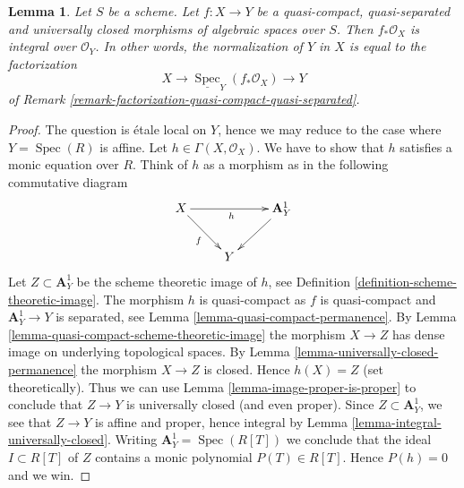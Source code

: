 \documentclass[10pt,a4paper]{amsart}
\theoremstyle{plain}
\newtheorem{lemma}[subsection]{Lemma}
\theoremstyle{definition}
\theoremstyle{remark}
\numberwithin{equation}{subsection}
\def\Spec{\mathop{\mathrm{Spec}}}
\begin{document}
\begin{lemma}
\label{lemma-normalization-in-universally-closed}
Let $S$ be a scheme.
Let $f : X \to Y$ be a quasi-compact, quasi-separated and
universally closed morphisms of algebraic spaces over $S$.
Then $f_*\mathcal{O}_X$ is integral over $\mathcal{O}_Y$. In other
words, the normalization of $Y$ in $X$ is equal to the factorization
$$
X \longrightarrow \underline{\Spec}_Y(f_*\mathcal{O}_X)
\longrightarrow Y
$$
of Remark \ref{remark-factorization-quasi-compact-quasi-separated}.
\end{lemma}

\begin{proof}
The question is \'etale local on $Y$, hence we may reduce to the
case where $Y = \Spec(R)$ is affine. Let $h \in \Gamma(X, \mathcal{O}_X)$.
We have to show that $h$ satisfies a monic equation over $R$. Think of $h$
as a morphism as in the following commutative diagram
$$
\xymatrix{
X \ar[rr]_h \ar[rd]_f & & \mathbf{A}^1_Y \ar[ld] \\
& Y &
}
$$
Let $Z \subset \mathbf{A}^1_Y$ be the scheme theoretic image of $h$,
see Definition \ref{definition-scheme-theoretic-image}.
The morphism $h$ is quasi-compact as $f$ is quasi-compact and
$\mathbf{A}^1_Y \to Y$ is separated, see
Lemma \ref{lemma-quasi-compact-permanence}.
By Lemma \ref{lemma-quasi-compact-scheme-theoretic-image} the
morphism $X \to Z$ has dense image on underlying topological spaces. By
Lemma \ref{lemma-universally-closed-permanence} the morphism
$X \to Z$ is closed. Hence $h(X) = Z$ (set theoretically).
Thus we can use
Lemma \ref{lemma-image-proper-is-proper}
to conclude that $Z \to Y$ is universally closed (and even proper).
Since $Z \subset \mathbf{A}^1_Y$, we see that $Z \to Y$ is affine
and proper, hence integral by Lemma \ref{lemma-integral-universally-closed}.
Writing $\mathbf{A}^1_Y = \Spec(R[T])$ we conclude that
the ideal $I \subset R[T]$ of $Z$ contains a monic polynomial
$P(T) \in R[T]$. Hence $P(h) = 0$ and we win.
\end{proof}
\end{document}
